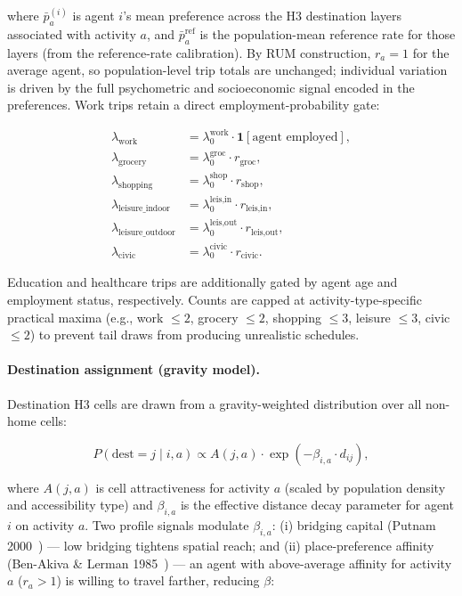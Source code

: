 \documentclass[a4paper,12pt]{article}
\begin{document}
where $\bar{p}_a^{(i)}$ is agent $i$'s mean preference across the H3 destination
layers associated with activity $a$, and $\bar{p}_a^{\text{ref}}$ is the
population-mean reference rate for those layers (from the reference-rate calibration).
By RUM construction, $r_a = 1$ for the average agent, so population-level
trip totals are unchanged; individual variation is driven by the full
psychometric and socioeconomic signal encoded in the preferences.
Work trips retain a direct employment-probability gate:

\begin{align}
\lambda_\text{work}              &= \lambda_0^\text{work}
                                    \cdot \mathbf{1}[\text{agent employed}], \\
\lambda_\text{grocery}           &= \lambda_0^\text{groc} \cdot r_\text{groc}, \\
\lambda_\text{shopping}          &= \lambda_0^\text{shop} \cdot r_\text{shop}, \\
\lambda_\text{leisure\_indoor}   &= \lambda_0^\text{leis,in}  \cdot r_\text{leis,in}, \\
\lambda_\text{leisure\_outdoor}  &= \lambda_0^\text{leis,out} \cdot r_\text{leis,out}, \\
\lambda_\text{civic}             &= \lambda_0^\text{civic} \cdot r_\text{civic}.
\end{align}

Education and healthcare trips are additionally gated by agent age and employment
status, respectively. Counts are capped at activity-type-specific practical maxima
(e.g., work $\leq 2$, grocery $\leq 2$, shopping $\leq 3$, leisure $\leq 3$,
civic $\leq 2$) to prevent tail draws from producing unrealistic schedules.

\paragraph{Destination assignment (gravity model).}
Destination H3 cells are drawn from a gravity-weighted distribution over
all non-home cells:

\begin{equation}
  P(\text{dest}=j \mid i, a) \propto A(j, a) \cdot \exp(-\beta_{i,a} \cdot d_{ij}),
\end{equation}

where $A(j, a)$ is cell attractiveness for activity $a$ (scaled by population
density and accessibility type) and $\beta_{i,a}$ is the effective distance
decay parameter for agent $i$ on activity $a$. Two profile signals modulate
$\beta_{i,a}$: (i) bridging capital (Putnam 2000~\cite{putnam2000bowling}) ---
low bridging tightens spatial reach; and (ii) place-preference affinity
(Ben-Akiva \& Lerman 1985~\cite{ben1985discrete}) --- an agent with
above-average affinity for activity $a$ ($r_a > 1$) is willing to travel
farther, reducing $\beta$:
\end{document}
